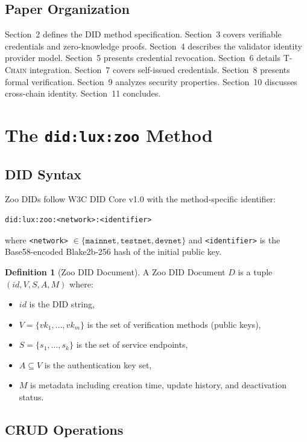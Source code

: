 \documentclass[11pt,letterpaper]{article}
\theoremstyle{definition}
\newtheorem{definition}{Definition}
\theoremstyle{remark}
\newcommand{\TChain}{\textsc{T-Chain}}
\begin{document}
\subsection{Paper Organization}

Section~2 defines the DID method specification. Section~3 covers verifiable credentials and zero-knowledge proofs. Section~4 describes the validator identity provider model. Section~5 presents credential revocation. Section~6 details \TChain{} integration. Section~7 covers self-issued credentials. Section~8 presents formal verification. Section~9 analyzes security properties. Section~10 discusses cross-chain identity. Section~11 concludes.

\section{The \texttt{did:lux:zoo} Method}

\subsection{DID Syntax}

Zoo DIDs follow W3C DID Core v1.0 \cite{w3c-did-core} with the method-specific identifier:

\begin{verbatim}
did:lux:zoo:<network>:<identifier>
\end{verbatim}

where \texttt{<network>} $\in \{\texttt{mainnet}, \texttt{testnet}, \texttt{devnet}\}$ and \texttt{<identifier>} is the Base58-encoded Blake2b-256 hash of the initial public key.

\begin{definition}[Zoo DID Document]
A Zoo DID Document $D$ is a tuple $(id, V, S, A, M)$ where:
\begin{itemize}
\item $id$ is the DID string,
\item $V = \{vk_1, \ldots, vk_m\}$ is the set of verification methods (public keys),
\item $S = \{s_1, \ldots, s_k\}$ is the set of service endpoints,
\item $A \subseteq V$ is the authentication key set,
\item $M$ is metadata including creation time, update history, and deactivation status.
\end{itemize}
\end{definition}

\subsection{CRUD Operations}
\end{document}

